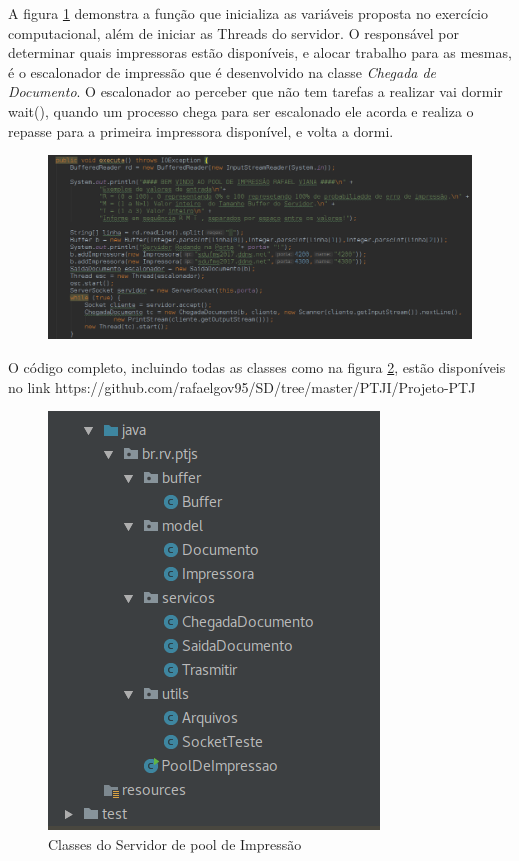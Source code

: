 \documentclass[12pt]{article}
\begin{document}
	A figura \ref{fig:screenshot006} demonstra a função que inicializa as variáveis proposta no exercício computacional, além de iniciar as Threads do servidor. 
O responsável por determinar quais impressoras estão disponíveis, e alocar trabalho para as mesmas, é o escalonador de impressão que é desenvolvido na classe \textit{Chegada de Documento}.
O escalonador ao perceber que não tem tarefas a realizar vai dormir wait(), quando um processo chega para ser escalonado ele acorda e realiza o repasse para a primeira impressora disponível, e volta a dormi.


\begin{figure}[H]
	\centering
	\includegraphics[width=1\linewidth]{imagens/screenshot017}
	\caption{}
	\label{fig:screenshot006}
\end{figure}
O código completo, incluindo todas as classes como na figura \ref{fig:screenshot008}, estão disponíveis no link https://github.com/rafaelgov95/SD/tree/master/PTJI/Projeto-PTJ


\begin{figure}[H]
	\centering
	\includegraphics[width=0.4\linewidth]{imagens/screenshot016}
	\caption{Classes do Servidor de pool de Impressão}
	\label{fig:screenshot008}
\end{figure}
\end{document}
